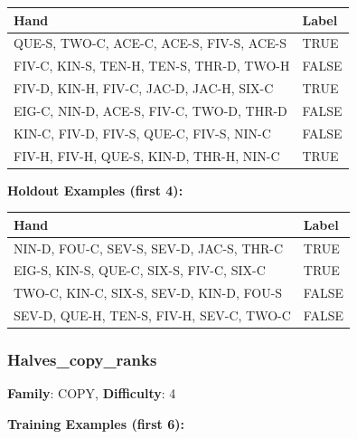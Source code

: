 \documentclass[10pt,a4paper]{article}
\begin{document}
\begin{small}
\begin{tabular}{p{8cm}l}
\toprule
Hand & Label \\
\midrule
QUE-S, TWO-C, ACE-C, ACE-S, FIV-S, ACE-S & \textcolor{positive}{TRUE} \\
FIV-C, KIN-S, TEN-H, TEN-S, THR-D, TWO-H & \textcolor{negative}{FALSE} \\
FIV-D, KIN-H, FIV-C, JAC-D, JAC-H, SIX-C & \textcolor{positive}{TRUE} \\
EIG-C, NIN-D, ACE-S, FIV-C, TWO-D, THR-D & \textcolor{negative}{FALSE} \\
KIN-C, FIV-D, FIV-S, QUE-C, FIV-S, NIN-C & \textcolor{negative}{FALSE} \\
FIV-H, FIV-H, QUE-S, KIN-D, THR-H, NIN-C & \textcolor{positive}{TRUE} \\
\bottomrule
\end{tabular}
\end{small}

\textbf{Holdout Examples (first 4):}

\begin{small}
\begin{tabular}{p{8cm}l}
\toprule
Hand & Label \\
\midrule
NIN-D, FOU-C, SEV-S, SEV-D, JAC-S, THR-C & \textcolor{positive}{TRUE} \\
EIG-S, KIN-S, QUE-C, SIX-S, FIV-C, SIX-C & \textcolor{positive}{TRUE} \\
TWO-C, KIN-C, SIX-S, SEV-D, KIN-D, FOU-S & \textcolor{negative}{FALSE} \\
SEV-D, QUE-H, TEN-S, FIV-H, SEV-C, TWO-C & \textcolor{negative}{FALSE} \\
\bottomrule
\end{tabular}
\end{small}

\vspace{0.5cm}

\subsubsection{Halves\_copy\_ranks}

\textbf{Family}: COPY, \textbf{Difficulty}: 4

\textbf{Training Examples (first 6):}
\end{document}
